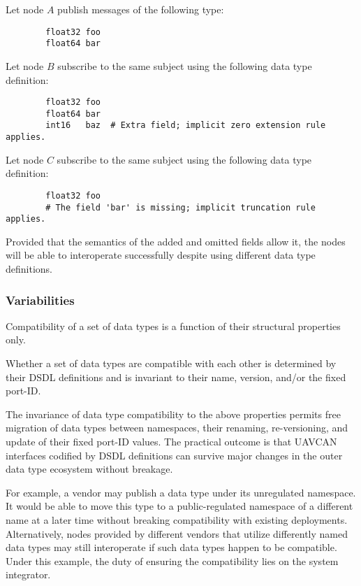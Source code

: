\begin{remark}
    Let node $A$ publish messages of the following type:

    \begin{verbatim}
        float32 foo
        float64 bar
    \end{verbatim}

    Let node $B$ subscribe to the same subject using the following data type definition:

    \begin{verbatim}
        float32 foo
        float64 bar
        int16   baz  # Extra field; implicit zero extension rule applies.
    \end{verbatim}

    Let node $C$ subscribe to the same subject using the following data type definition:

    \begin{verbatim}
        float32 foo
        # The field 'bar' is missing; implicit truncation rule applies.
    \end{verbatim}

    Provided that the semantics of the added and omitted fields allow it,
    the nodes will be able to interoperate successfully despite using different data type definitions.
\end{remark}

\subsubsection{Variabilities}

Compatibility of a set of data types is a function of their structural properties only.

Whether a set of data types are compatible with each other is determined by their DSDL definitions
and is invariant to their name, version, and/or the fixed port-ID.

\begin{remark}[breakable]
    The invariance of data type compatibility to the above properties permits free migration of
    data types between namespaces, their renaming, re-versioning, and update of their fixed port-ID values.
    The practical outcome is that UAVCAN interfaces codified by DSDL definitions can survive
    major changes in the outer data type ecosystem without breakage.

    For example, a vendor may publish a data type under its unregulated namespace.
    It would be able to move this type to a public-regulated namespace of a different name
    at a later time without breaking compatibility with existing deployments.
    Alternatively, nodes provided by different vendors that utilize differently named data types may
    still interoperate if such data types happen to be compatible.
    Under this example, the duty of ensuring the compatibility lies on the system integrator.
\end{remark}

